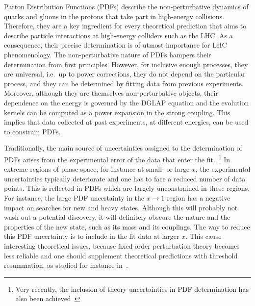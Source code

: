 Parton Distribution Functions (PDFs) describe the non-perturbative dynamics of quarks and gluons in the protons that take part in high-energy collisions. Therefore, they are a key ingredient for every theoretical prediction that aims to describe particle interactions at high-energy colliders such as the LHC. As a consequence, their precise determination is of utmost importance for LHC phenomenology. 
%
The non-perturbative nature of PDFs hampers their determination from first principles.
%
However, for inclusive enough processes, they are universal, i.e.\, up to power corrections, they do not depend on the particular process, and they can be determined by fitting data from previous experiments. Moreover, although they are themselves non-perturbative objects, their dependence on the energy is governed by the DGLAP equation and the evolution kernels can be computed as a power expansion in the strong coupling. This implies that data collected at past experiments, at different energies, can be used to constrain PDFs. 

Traditionally, the main source of uncertainties assigned to the determination of PDFs arises from the experimental error of the data that enter the fit.~\footnote{Very recently, the inclusion of theory uncertainties in PDF determination has also been achieved~\cite{Harland-Lang:2018bxd,AbdulKhalek:2019ihb,AbdulKhalek:2019bux}} In extreme regions of phase-space, for instance at small- or large-$x$, the experimental uncertainties typically deteriorate and one has to face a reduced number of data points. This is reflected in PDFs which are largely unconstrained in these regions. 
%
For instance, the large PDF uncertainty in the $x\to 1$ region has a negative impact on searches for new and heavy states.
%
 Although this will probably not wash out a potential discovery, it will definitely obscure the nature and the properties of the new state, such as its mass and its couplings. 
%
The way to reduce this PDF uncertainty is to include in the fit data at larger $x$. This cause interesting theoretical issues, because fixed-order perturbation theory becomes less reliable and one should supplement theoretical predictions with threshold resummation, as studied for instance in~\cite{Corcella:2005us,Sato:2013wea,Westmark:2013vea,Bonvini:2015ira,Accardi:2014qda}.


